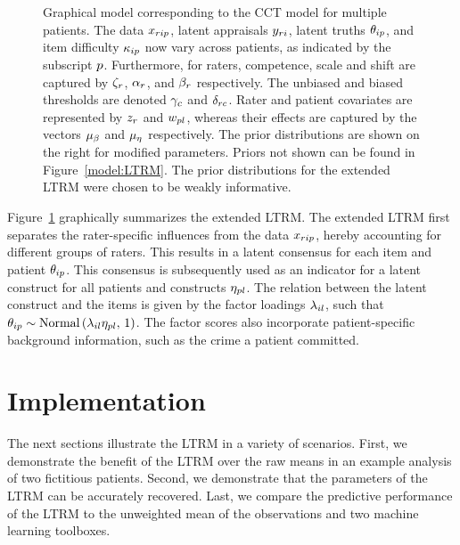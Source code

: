 \documentclass[a4paper,usenames,dvipsnames]{article}
\begin{document}
\begin{figure}[!ht]
	\caption{Graphical model corresponding to the CCT model for multiple patients. The data $x_{rip}$, latent appraisals $y_{ri}$, latent truths $\theta_{ip}$, and item difficulty $\kappa_{ip}$ now vary across patients, as indicated by the subscript $p$. Furthermore, for raters, competence, scale and shift are captured by $\zeta_r$, $\alpha_r$, and $\beta_r$ respectively. The unbiased and biased thresholds are denoted $\gamma_c$ and $\delta_{rc}$. Rater and patient covariates are represented by $z_r$ and $w_{pl}$, whereas their effects are captured by the vectors $\mu_{\beta}$ and $\mu_{\eta}$ respectively. The prior distributions are shown on the right for modified parameters. Priors not shown can be found in Figure~\ref{model:LTRM}. The prior distributions for the extended LTRM were chosen to be weakly informative.}
	\label{model:LTRM3}
\end{figure}
Figure~\ref{model:LTRM3} graphically summarizes the extended LTRM. The extended LTRM first separates the rater-specific influences from the data $x_{rip}$, hereby accounting for different groups of raters. This results in a latent consensus for each item and patient $\theta_{ip}$. This consensus is subsequently used as an indicator for a latent construct for all patients and constructs $\eta_{pl}$. The relation between the latent construct and the items is given by the factor loadings $\lambda_{il}$, such that $\theta_{ip} \sim \text{Normal}\left(\lambda_{il}\eta_{pl},\,1\right)$. The factor scores also incorporate patient-specific background information, such as the crime a patient committed.

\section*{Implementation}
The next sections illustrate the LTRM in a variety of scenarios. First, we demonstrate the benefit of the LTRM over the raw means in an example analysis of two fictitious patients. Second, we demonstrate that the parameters of the LTRM can be accurately recovered. Last, we compare the predictive performance of the LTRM to the unweighted mean of the observations and two machine learning toolboxes.
\end{document}
